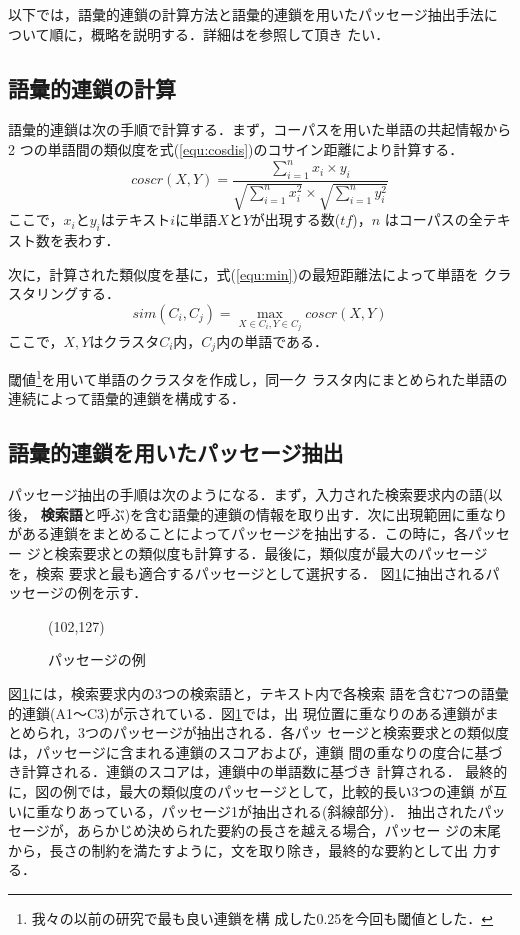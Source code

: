 以下では，語彙的連鎖の計算方法と語彙的連鎖を用いたパッセージ抽出手法に
ついて順に，概略を説明する．詳細は\cite{Mochizuki:99:a}を参照して頂き
たい．

\subsection{語彙的連鎖の計算}\label{subsec:lexcal}
語彙的連鎖は次の手順で計算する．まず，コーパスを用いた単語の共起情報から2
つの単語間の類似度を式(\ref{equ:cosdis})のコサイン距離により計算する．
	\begin{equation}\label{equ:cosdis}
	coscr(X,Y) = \frac{\sum_{i=1}^{n} x_{i} \times y_{i}}
	{\sqrt{\sum_{i=1}^{n} x_{i}^{2}} \times \sqrt{\sum_{i=1}^{n}
	y_{i}^{2}}}
	\end{equation}
ここで，$x_{i}$と$y_{i}$はテキスト$i$に単語$X$と$Y$が出現する数($tf$)，$n$
はコーパスの全テキスト数を表わす．

次に，計算された類似度を基に，式(\ref{equ:min})の最短距離法によって単語を
クラスタリングする．
	\begin{equation}\label{equ:min}
	sim(C_i,C_j)=\max_{X\in C_{i},Y\in C_{j}} coscr(X, Y)
	\end{equation}
ここで，$X,Y$はクラスタ$C_i$内，$C_j$内の単語である．

閾値\footnote{我々の以前の研究\cite{Mochizuki:99:a}で最も良い連鎖を構
成した0.25を今回も閾値とした．}を用いて単語のクラスタを作成し，同一ク
ラスタ内にまとめられた単語の連続によって語彙的連鎖を構成する．

\subsection{語彙的連鎖を用いたパッセージ抽出}\label{subsec:expas}
パッセージ抽出の手順は次のようになる．まず，入力された検索要求内の語(以後，
{\bf 検索語}と呼ぶ)を含む語彙的連鎖の情報を取り出す．次に出現範囲に重なり
がある連鎖をまとめることによってパッセージを抽出する．この時に，各パッセー
ジと検索要求との類似度も計算する．最後に，類似度が最大のパッセージを，検索
要求と最も適合するパッセージとして選択する．
図\ref{fig:pasimg}に抽出されるパッセージの例を示す．

\begin{figure}[htbp]
\begin{center}
\atari(102,127)
\caption{パッセージの例}\label{fig:pasimg}
\end{center}
\end{figure}

図\ref{fig:pasimg}には，検索要求内の3つの検索語と，テキスト内で各検索
語を含む7つの語彙的連鎖(A1〜C3)が示されている．図\ref{fig:pasimg}では，出
現位置に重なりのある連鎖がまとめられ，3つのパッセージが抽出される．各パッ
セージと検索要求との類似度は，パッセージに含まれる連鎖のスコアおよび，連鎖
間の重なりの度合に基づき計算される．連鎖のスコアは，連鎖中の単語数に基づき
計算される．
最終的に，図の例では，最大の類似度のパッセージとして，比較的長い3つの連鎖
が互いに重なりあっている，パッセージ1が抽出される(斜線部分)．
抽出されたパッセージが，あらかじめ決められた要約の長さを越える場合，パッセー
ジの末尾から，長さの制約を満たすように，文を取り除き，最終的な要約として出
力する．

